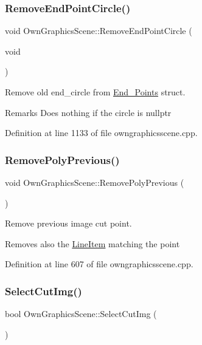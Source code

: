 \subsubsection{\texorpdfstring{Remove\+End\+Point\+Circle()}{RemoveEndPointCircle()}}
{\footnotesize\ttfamily void Own\+Graphics\+Scene\+::\+Remove\+End\+Point\+Circle (\begin{DoxyParamCaption}\item[{void}]{ }\end{DoxyParamCaption})}



Remove old end\+\_\+circle from \mbox{\hyperlink{structEnd__Points}{End\+\_\+\+Points}} struct. 

\begin{DoxyRemark}{Remarks}
Does nothing if the circle is nullptr 
\end{DoxyRemark}


Definition at line 1133 of file owngraphicsscene.\+cpp.

\mbox{\label{classOwnGraphicsScene_a4976a8e6f682612acd3e23b6c98bd8d8}} 
\subsubsection{\texorpdfstring{Remove\+Poly\+Previous()}{RemovePolyPrevious()}}
{\footnotesize\ttfamily void Own\+Graphics\+Scene\+::\+Remove\+Poly\+Previous (\begin{DoxyParamCaption}{ }\end{DoxyParamCaption})}



Remove previous image cut point. 

Removes also the \mbox{\hyperlink{classLineItem}{Line\+Item}} matching the point 

Definition at line 607 of file owngraphicsscene.\+cpp.

\mbox{\label{classOwnGraphicsScene_ae79aa179ce90ab26f06d7d17eed96b93}} 
\subsubsection{\texorpdfstring{Select\+Cut\+Img()}{SelectCutImg()}}
{\footnotesize\ttfamily bool Own\+Graphics\+Scene\+::\+Select\+Cut\+Img (\begin{DoxyParamCaption}{ }\end{DoxyParamCaption})}



